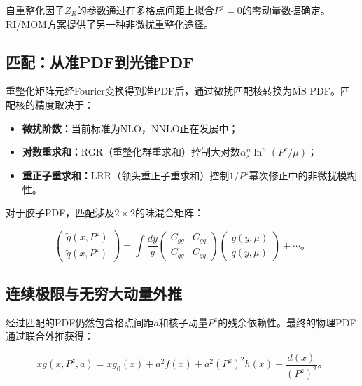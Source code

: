 \documentclass[12pt,a4paper]{ctexart}
\theoremstyle{definition}
\begin{document}
自重整化因子$Z_R$的参数通过在多格点间距上拟合$P^z=0$的零动量数据确定\cite{Huo2021self,Chen2025gluon}。RI/MOM方案\cite{Liu2019isovector,Zhang2019}提供了另一种非微扰重整化途径。

\subsection{匹配：从准PDF到光锥PDF}

重整化矩阵元经Fourier变换得到准PDF后，通过微扰匹配核转换为$\overline{\text{MS}}$ PDF。匹配核的精度取决于：

\begin{itemize}
    \item \textbf{微扰阶数：}当前标准为NLO，NNLO正在发展中\cite{Yao2023}；
    \item \textbf{对数重求和：}RGR（重整化群重求和）控制大对数$\alpha_s^n\ln^n(P^z/\mu)$\cite{Zhang2023RGR}；
    \item \textbf{重正子重求和：}LRR（领头重正子重求和）控制$1/P^z$幂次修正中的非微扰模糊性\cite{Zhang2023RGR,Su2023LRR}。
\end{itemize}

对于胶子PDF，匹配涉及$2 \times 2$的味混合矩阵\cite{Zhang2019,Yao2023}：

\begin{equation}
\begin{pmatrix} \tilde{g}(x, P^z) \\ \tilde{q}(x, P^z) \end{pmatrix} = \int \frac{dy}{y}
\begin{pmatrix} C_{gg} & C_{gq} \\ C_{qg} & C_{qq} \end{pmatrix}
\begin{pmatrix} g(y, \mu) \\ q(y, \mu) \end{pmatrix} + \cdots。
\label{eq:mixing_matrix}
\end{equation}

\subsection{连续极限与无穷大动量外推}

经过匹配的PDF仍然包含格点间距$a$和核子动量$P^z$的残余依赖性。最终的物理PDF通过联合外推获得\cite{Chen2025gluon}：

\begin{equation}
\boxed{xg(x, P^z, a) = xg_0(x) + a^2 f(x) + a^2 (P^z)^2 h(x) + \frac{d(x)}{(P^z)^2}}。
\label{eq:joint_extrap}
\end{equation}
\end{document}
